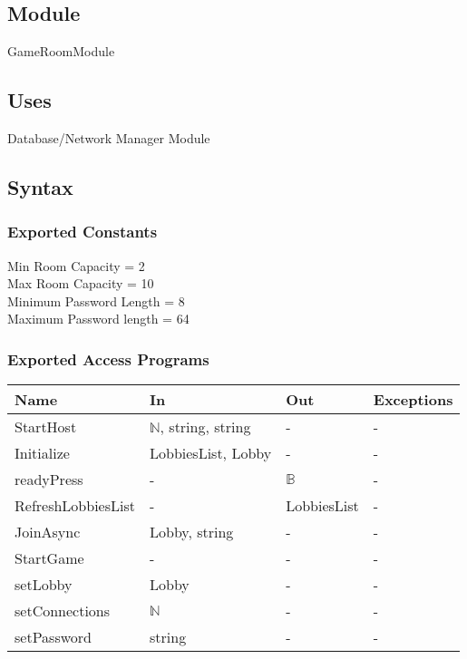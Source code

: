 \documentclass[12pt, titlepage]{article}
\begin{document}
\subsection{Module}

GameRoomModule

\subsection{Uses}

Database/Network Manager Module

\subsection{Syntax}

\subsubsection{Exported Constants}

Min Room Capacity = 2\\
Max Room Capacity = 10\\
Minimum Password Length = 8\\
Maximum Password length = 64\\

\subsubsection{Exported Access Programs}

\begin{center}
\begin{tabular}{p{5cm} p{4cm} p{4cm} p{2cm}}
\hline
\textbf{Name} & \textbf{In} & \textbf{Out} & \textbf{Exceptions} \\
\hline
StartHost & $\mathbb{N}$, string, string & - & - \\
Initialize  & LobbiesList, Lobby & - & - \\
readyPress  & - & $\mathbb{B}$ & - \\
RefreshLobbiesList  & - & LobbiesList & - \\
JoinAsync  & Lobby, string & - & - \\
StartGame & - & - & - \\
setLobby  & Lobby & - & - \\
setConnections & $\mathbb{N}$ & - & - \\
setPassword & string & - & - \\
\hline
\end{tabular}
\end{center}
\end{document}
